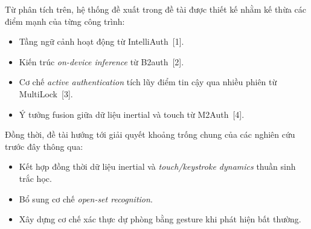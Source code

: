 \documentclass[../DoAn.tex]{subfiles}
\begin{document}
    Từ phân tích trên, hệ thống đề xuất trong đề tài được thiết kế nhằm kế thừa các điểm mạnh của từng công trình:
    \begin{itemize}
        \item Tầng ngữ cảnh hoạt động từ IntelliAuth~[1].
        
        \item Kiến trúc \textit{on-device inference} từ B2auth~[2].
        
        \item Cơ chế \textit{active authentication} tích lũy điểm tin cậy qua nhiều phiên từ MultiLock~[3].
        
        \item Ý tưởng fusion giữa dữ liệu inertial và touch từ M2Auth~[4].
    \end{itemize}
    
    Đồng thời, đề tài hướng tới giải quyết khoảng trống chung của các nghiên cứu trước đây thông qua:
    \begin{itemize}
        \item Kết hợp đồng thời dữ liệu inertial và \textit{touch/keystroke dynamics} thuần sinh trắc học.
        
        \item Bổ sung cơ chế \textit{open-set recognition}.
        
        \item Xây dựng cơ chế xác thực dự phòng bằng gesture khi phát hiện bất thường.
    \end{itemize}
\end{document}
